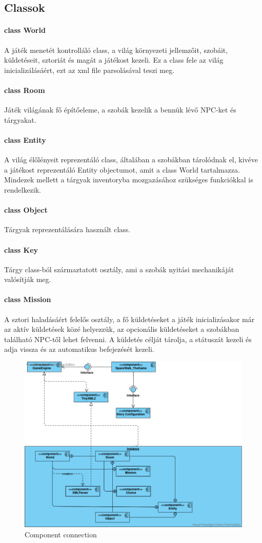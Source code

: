 \documentclass{scrarticle}
\begin{document}
\subsection{Classok}
\paragraph{class World}
A játék menetét kontrolláló class, a világ környezeti jellemzőit, szobáit, küldetéseit, sztoriát és magát a játékost kezeli. Ez a class fele az világ inicializálásáért, ezt az xml file parsolásával teszi meg.
\paragraph{class Room}
Játék világának fő építőeleme, a szobák kezelik a bennük lévő NPC-ket és tárgyakat.
\paragraph{class Entity}
A világ élőlényeit reprezentáló class, általában a szobákban tárolódnak el, kivéve a játékost reprezentáló Entity objectumot, amit a class World tartalmazza. Mindezek mellett a tárgyak inventoryba mozgazásához szükséges funkciókkal is rendelkezik.
\paragraph{class Object}
Tárgyak reprezentálására használt class.
\paragraph{class Key}
Tárgy class-ból származtatott osztály, ami a szobák nyitási mechanikáját valósítják meg.
\paragraph{class Mission}
A sztori haladásáért felelős osztály, a fő küldetéseket a játék inicializásakor már az aktív küldetések közé helyezzük, az opcionális küldetéseket a szobákban található NPC-től lehet felvenni. A küldetés célját tárolja, a státuszát kezeli és adja vissza és az automatikus befejezését kezeli.

\begin{figure}[H]
    \includegraphics[width=0.75\columnwidth]{Component_Connection.jpg}
    \caption{Component connection}\label{fig:3}
\end{figure}
\end{document}
